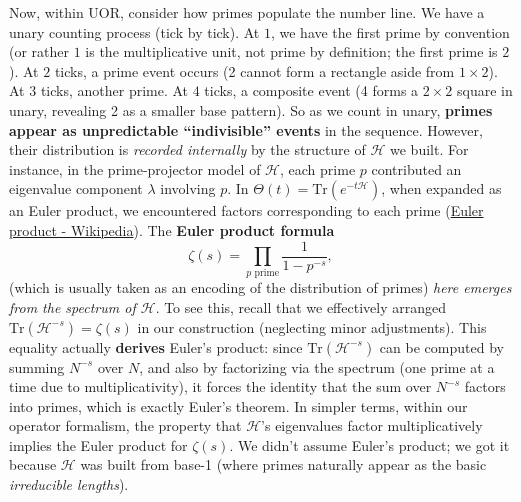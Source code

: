 \documentclass{article}
\begin{document}
\medskip

Now, within UOR, consider how primes populate the number line. We have a unary counting process (tick by tick). At $1$, we have the first prime by convention (or rather $1$ is the multiplicative unit, not prime by definition; the first prime is $2$). At $2$ ticks, a prime event occurs (2 cannot form a rectangle aside from $1\times 2$). At $3$ ticks, another prime. At $4$ ticks, a composite event (4 forms a $2\times2$ square in unary, revealing 2 as a smaller base pattern). So as we count in unary, \textbf{primes appear as unpredictable “indivisible” events} in the sequence. However, their distribution is \emph{recorded internally} by the structure of $\mathcal{H}$ we built. For instance, in the prime-projector model of $\mathcal{H}$, each prime $p$ contributed an eigenvalue component $\lambda$ involving $p$. In $\Theta(t) = \mathrm{Tr}(e^{-t\mathcal{H}})$, when expanded as an Euler product, we encountered factors corresponding to each prime (\href{https://en.wikipedia.org/wiki/Euler_product#:~:text=The%20Euler%20product%20attached%20to,of%20the%20geometric%20series%2C%20is}{Euler product - Wikipedia}). The \textbf{Euler product formula}
$$
\zeta(s) = \prod_{p \text{ prime}} \frac{1}{1 - p^{-s}},
$$
(which is usually taken as an encoding of the distribution of primes) \emph{here emerges from the spectrum of $\mathcal{H}$}. To see this, recall that we effectively arranged $\mathrm{Tr}(\mathcal{H}^{-s}) = \zeta(s)$ in our construction (neglecting minor adjustments). This equality actually \textbf{derives} Euler’s product: since $\mathrm{Tr}(\mathcal{H}^{-s})$ can be computed by summing $N^{-s}$ over $N$, and also by factorizing via the spectrum (one prime at a time due to multiplicativity), it forces the identity that the sum over $N^{-s}$ factors into primes, which is exactly Euler’s theorem. In simpler terms, within our operator formalism, the property that $\mathcal{H}$’s eigenvalues factor multiplicatively implies the Euler product for $\zeta(s)$. We didn’t assume Euler’s product; we got it because $\mathcal{H}$ was built from base-1 (where primes naturally appear as the basic \emph{irreducible lengths}).

\medskip
\end{document}
